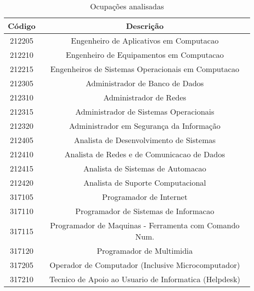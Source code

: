 \begin{table}[htbp]
	\caption{Ocupações analisadas}
	\begin{center}
		\begin{tabular}{|c|c|}
			\hline
			\textbf{Código} & \textbf{Descrição}                                  \\ 
			\hline
			212205           & Engenheiro de Aplicativos em Computacao               \\
			212210           & Engenheiro de Equipamentos em Computacao              \\
			212215           & Engenheiros de Sistemas Operacionais em Computacao    \\
			\hline 										
			212305           & Administrador de Banco de Dados                       \\
			212310           & Administrador de Redes                                \\
			212315           & Administrador de Sistemas Operacionais                \\
			212320           & Administrador em Segurança da Informação           \\
			\hline 									
			212405           & Analista de Desenvolvimento de Sistemas               \\
			212410           & Analista de Redes e de Comunicacao de Dados           \\
			212415           & Analista de Sistemas de Automacao                     \\
			212420           & Analista de Suporte Computacional                     \\
			\hline 									
			317105           & Programador de Internet                               \\
			317110           & Programador de Sistemas de Informacao                 \\
			317115           & Programador de Maquinas - Ferramenta com Comando Num. \\
			317120           & Programador de Multimidia                             \\
			\hline 									
			317205           & Operador de Computador (Inclusive Microcomputador)    \\
			317210           & Tecnico de Apoio ao Usuario de Informatica (Helpdesk) \\
			\hline
		\end{tabular}
		\label{ocupacoes}
	\end{center}
\end{table}